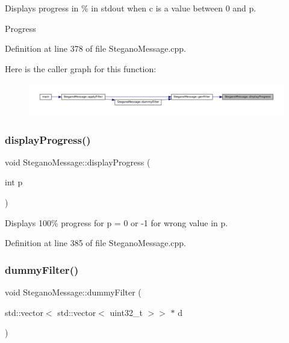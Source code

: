 Displays progress in \% in stdout when c is a value between 0 and p. 

Progress 

Definition at line 378 of file Stegano\+Message.\+cpp.

Here is the caller graph for this function\+:
\nopagebreak
\begin{figure}[H]
\begin{center}
\leavevmode
\includegraphics[width=350pt]{classSteganoMessage_a50936bb2352eaaa1112280c2ac3ca2d5_icgraph}
\end{center}
\end{figure}
\mbox{\label{classSteganoMessage_aa6e24f6ed5afcf38dcba28fb91a74d21}} 
\subsubsection{\texorpdfstring{displayProgress()}{displayProgress()}\hspace{0.1cm}{\footnotesize\ttfamily [2/2]}}
{\footnotesize\ttfamily void Stegano\+Message\+::display\+Progress (\begin{DoxyParamCaption}\item[{int}]{p }\end{DoxyParamCaption})\hspace{0.3cm}{\ttfamily [private]}}



Displays 100\% progress for p = 0 or -\/1 for wrong value in p. 



Definition at line 385 of file Stegano\+Message.\+cpp.

\mbox{\label{classSteganoMessage_a1a26242c2e6d146cba1ad6831ab60ba7}} 
\subsubsection{\texorpdfstring{dummyFilter()}{dummyFilter()}}
{\footnotesize\ttfamily void Stegano\+Message\+::dummy\+Filter (\begin{DoxyParamCaption}\item[{std\+::vector$<$ std\+::vector$<$ uint32\+\_\+t $>$$>$ $\ast$}]{d }\end{DoxyParamCaption})\hspace{0.3cm}{\ttfamily [private]}}



